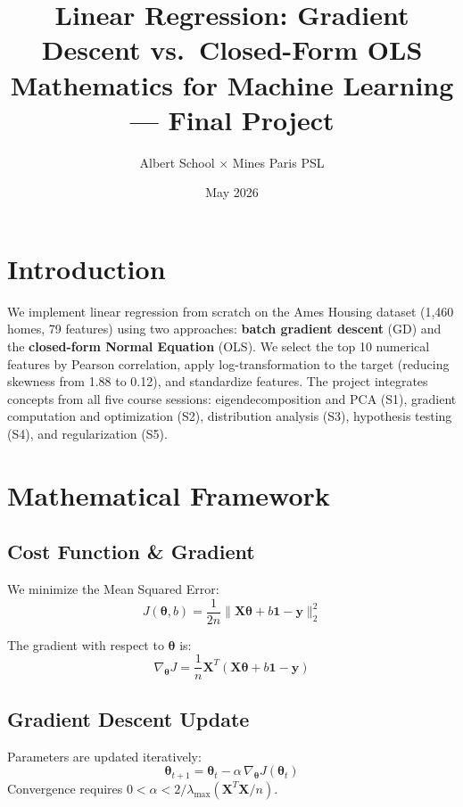 \documentclass[11pt, twocolumn]{article}
\title{\vspace{-1.5cm}\textbf{Linear Regression: Gradient Descent vs.\ Closed-Form OLS}\\[4pt]
\large Mathematics for Machine Learning --- Final Project}
\author{Albert School $\times$ Mines Paris PSL}
\date{May 2026}
\begin{document}
\maketitle
\vspace{-0.5cm}

\section{Introduction}

We implement linear regression from scratch on the Ames Housing dataset (1,460 homes, 79 features) using two approaches: \textbf{batch gradient descent} (GD) and the \textbf{closed-form Normal Equation} (OLS). We select the top 10 numerical features by Pearson correlation, apply log-transformation to the target (reducing skewness from 1.88 to 0.12), and standardize features. The project integrates concepts from all five course sessions: eigendecomposition and PCA (S1), gradient computation and optimization (S2), distribution analysis (S3), hypothesis testing (S4), and regularization (S5).

\section{Mathematical Framework}

\subsection{Cost Function \& Gradient}

We minimize the Mean Squared Error:
\begin{equation}
J(\boldsymbol{\theta}, b) = \frac{1}{2n} \|\mathbf{X}\boldsymbol{\theta} + b\mathbf{1} - \mathbf{y}\|_2^2
\end{equation}

The gradient with respect to $\boldsymbol{\theta}$ is:
\begin{equation}
\nabla_{\boldsymbol{\theta}} J = \frac{1}{n} \mathbf{X}^T(\mathbf{X}\boldsymbol{\theta} + b\mathbf{1} - \mathbf{y})
\end{equation}

\subsection{Gradient Descent Update}

Parameters are updated iteratively:
\begin{equation}
\boldsymbol{\theta}_{t+1} = \boldsymbol{\theta}_t - \alpha\,\nabla_{\boldsymbol{\theta}} J(\boldsymbol{\theta}_t)
\end{equation}
Convergence requires $0 < \alpha < 2/\lambda_{\max}(\mathbf{X}^T\mathbf{X}/n)$.
\end{document}
